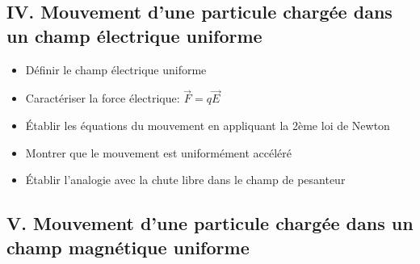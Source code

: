 \documentclass[12pt]{article}
\begin{document}
\subsection*{IV. Mouvement d'une particule chargée dans un champ électrique uniforme}

\begin{itemize}
    \item Définir le champ électrique uniforme
    \item Caractériser la force électrique: $\vec{F} = q\vec{E}$
    \item Établir les équations du mouvement en appliquant la 2ème loi de Newton
    \item Montrer que le mouvement est uniformément accéléré
    \item Établir l'analogie avec la chute libre dans le champ de pesanteur
\end{itemize}

\subsection*{V. Mouvement d'une particule chargée dans un champ magnétique uniforme}
\end{document}
